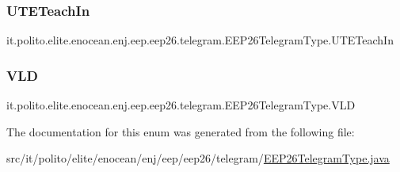 \subsubsection{\texorpdfstring{U\+T\+E\+Teach\+In}{UTETeachIn}}
{\footnotesize\ttfamily it.\+polito.\+elite.\+enocean.\+enj.\+eep.\+eep26.\+telegram.\+E\+E\+P26\+Telegram\+Type.\+U\+T\+E\+Teach\+In}

\hypertarget{enumit_1_1polito_1_1elite_1_1enocean_1_1enj_1_1eep_1_1eep26_1_1telegram_1_1_e_e_p26_telegram_type_aa4b4b8e74a50a076f2f9126f4cf05bbd}{}\label{enumit_1_1polito_1_1elite_1_1enocean_1_1enj_1_1eep_1_1eep26_1_1telegram_1_1_e_e_p26_telegram_type_aa4b4b8e74a50a076f2f9126f4cf05bbd} 
\subsubsection{\texorpdfstring{V\+LD}{VLD}}
{\footnotesize\ttfamily it.\+polito.\+elite.\+enocean.\+enj.\+eep.\+eep26.\+telegram.\+E\+E\+P26\+Telegram\+Type.\+V\+LD}



The documentation for this enum was generated from the following file\+:\begin{DoxyCompactItemize}
\item 
src/it/polito/elite/enocean/enj/eep/eep26/telegram/\hyperlink{_e_e_p26_telegram_type_8java}{E\+E\+P26\+Telegram\+Type.\+java}\end{DoxyCompactItemize}
